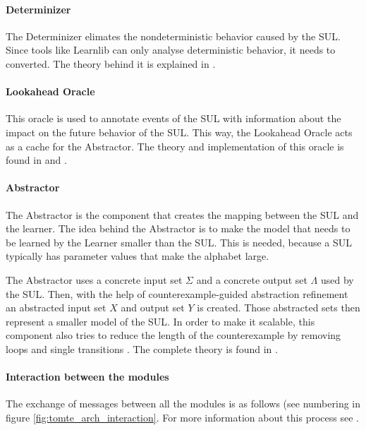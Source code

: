 \documentclass[multi,crop=false,class=article]{standalone}
\begin{document}
\paragraph{Determinizer} The Determinizer elimates the nondeterministic
behavior caused by the SUL. Since tools like Learnlib can only analyse
deterministic behavior, it needs to converted. The theory behind it is
explained in \cite[p. 172]{Aarts2015}.

\paragraph{Lookahead Oracle} This oracle is used to annotate events of the SUL
with information about the impact on the future behavior of the SUL. This way,
the Lookahead Oracle acts as a cache for the Abstractor. The theory and
implementation of this oracle is found in \cite[p. 170]{Aarts2014} and
\cite[p. 105]{Tomte2014}.

\paragraph{Abstractor} The Abstractor is the component that creates the mapping
between the SUL and the learner. The idea behind the Abstractor is to make the
model that needs to be learned by the Learner smaller than the SUL. This is
needed, because a SUL typically has parameter values that make the alphabet
large.

The Abstractor uses a concrete input set $\Sigma$ and a concrete
output set $\Lambda$ used by the SUL. Then, with the help of
counterexample-guided abstraction refinement\cite[p. 104]{Tomte2014} an
abstracted input set $X$ and output set $Y$ is created. Those abstracted sets
then represent a smaller model of the SUL. In order to make it scalable, this
component also tries to reduce the length of the counterexample by removing
loops and single transitions \cite{Koopman2014}. The complete theory is found
in \cite{Tomte2014}.

\paragraph{Interaction between the modules} The exchange of messages between
all the modules is as follows (see numbering in figure
\ref{fig:tomte_arch_interaction}. For more information about this process see
\cite{Aarts2015,Tomte2014}.
\end{document}
